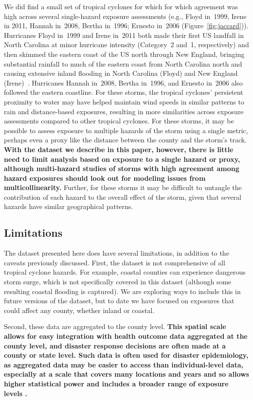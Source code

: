 We did find a small set of tropical cyclones for which for which agreement was
high across several single-hazard exposure assessments (e.g., Floyd in~1999,
Irene in 2011, Hannah in~2008, Bertha in~1996; Ernesto in~2006
(Figure~\ref{fig:jaccard})).  Hurricanes Floyd in~1999 and Irene in~2011 both
made their first \ac{US} landfall in North Carolina at minor hurricane
intensity (Category~2 and~1, respectively) and then skimmed the eastern coast
of the \ac{US} north through New England, bringing substantial rainfall to much
of the eastern coast from North Carolina north and causing extensive inland
flooding in North Carolina (Floyd) and New England
(Irene)~\parencite{avila2013atlantic, lawrence2000atlantic}.  Hurricanes Hannah
in~2008, Bertha in~1996, and Ernesto in~2006 also followed the eastern
coastline. For these storms, the tropical cyclones' persistent proximity to
water may have helped maintain wind speeds in similar patterns to rain and
distance-based exposures, resulting in more similarities across exposure
assessments compared to other tropical cyclones.  For these storms, it may be
possible to assess exposure to multiple hazards of the storm using a single
metric, perhaps even a proxy like the distance between the county and the
storm's track. \textbf{With the dataset we describe in this paper, however,
there is little need to limit analysis based on exposure to a single hazard or
proxy, although multi-hazard studies of storms with high agreement among hazard
exposures should look out for modeling issues from multicollinearity.} Further,
for these storms it may be difficult to untangle the contribution of each
hazard to the overall effect of the storm, given that several hazards have
similar geographical patterns. 

\subsection*{Limitations}

The dataset presented here does have several limitations, in addition to the
caveats previously discussed. First, the dataset is not comprehensive of all
tropical cyclone hazards. For example, coastal counties can experience
dangerous storm surge, which is not specifically covered in this dataset
(although some resulting coastal flooding is captured). We are exploring ways
to include this in future versions of the dataset, but to date we have focused
on exposures that could affect any county, whether inland or coastal.  

Second, these data are aggregated to the county level. \textbf{This spatial
scale allows for easy integration with health outcome data aggregated at the
county level, and disaster response decisions are often made at a county or
state level. Such data is often used for disaster epidemiology, as aggregated
data may be easier to access than individual-level data, especially at a scale
that covers many locations and years and so allows higher statistical power and
includes a broader range of exposure levels
\parencite{wakefield2008overcoming}.}

